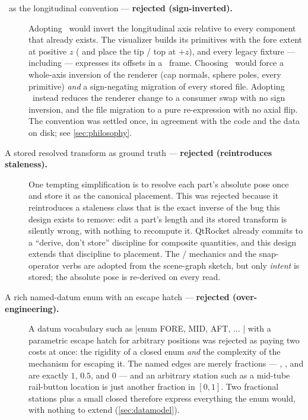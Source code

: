 \begin{description}

  \item[\zaft\ as the longitudinal convention --- \textbf{rejected (sign-inverted).}]
  Adopting \zaft\ would invert the longitudinal axis relative to every component that
  already exists. The visualizer builds its primitives with the fore extent at positive
  $z$ ( and  place the tip / top at $+z$), and every legacy
   fixture --- including  --- expresses
  its offsets in a \zfwd\ frame. Choosing \zaft\ would force a whole-axis inversion of the
  renderer (cap normals, sphere poles, every primitive) \emph{and} a sign-negating
  migration of every stored file. Adopting \zfwd\ instead reduces the renderer change to a
  consumer swap with no sign inversion, and the file migration to a pure re-expression with
  no axial flip. The convention was settled once, in agreement with the code and the data
  on disk; see \cref{sec:philosophy}.

  \item[A stored resolved transform as ground truth --- \textbf{rejected (reintroduces
  staleness).}] One tempting simplification is to resolve each part's absolute pose once
  and store it as the canonical placement. This was rejected because it reintroduces a
  staleness class that is the exact inverse of the bug this design exists to remove: edit a
  part's length and its stored transform is silently wrong, with nothing to recompute it.
  QtRocket already commits to a ``derive, don't store'' discipline for composite
  quantities, and this design extends that discipline to placement. The  /
   mechanics and the snap-operator verbs are adopted from the scene-graph
  sketch, but only \emph{intent} is stored; the absolute pose is re-derived on every read.

  \item[A rich named-datum enum with an escape hatch --- \textbf{rejected
  (over-engineering).}] A datum vocabulary such as \cppinline|enum { FORE, MID, AFT, ... }|
  with a parametric escape hatch for arbitrary positions was rejected as paying two costs at
  once: the rigidity of a closed enum \emph{and} the complexity of the mechanism for
  escaping it. The named edges are merely fractions --- , , and
   are exactly $1$, $0.5$, and $0$ --- and an arbitrary station such as a
  mid-tube rail-button location is just another fraction in $[0,1]$. Two fractional
  stations plus a small closed  therefore express everything the enum would,
  with nothing to extend (\cref{sec:datamodel}).


\end{description}
